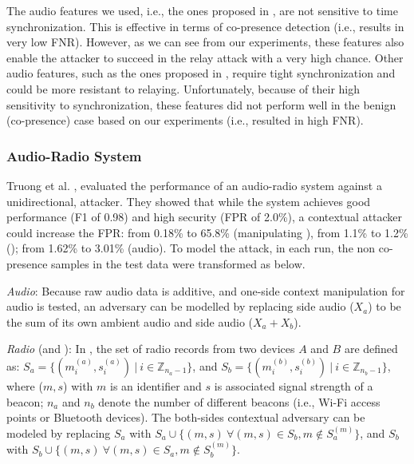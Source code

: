 The audio features we used, i.e., the ones proposed in
\cite{DBLP:conf/esorics/HaleviMSX12}, are not sensitive to time
synchronization. This is effective in terms of co-presence detection (i.e.,
results in very low FNR). However, as we can see from our experiments, these
features also enable the attacker to succeed in the relay attack with a very
high chance. Other audio features, such as the ones proposed in
\cite{schurmann2013audio}, require tight synchronization and could be more
resistant to relaying. Unfortunately, because of their high sensitivity to
synchronization, these features did not perform well in the benign
(co-presence) case based on our experiments (i.e., resulted in high FNR).










\subsubsection{Audio-Radio System}
Truong et al. \cite{TruongPerCom14}, evaluated the performance of an
audio-radio system against a unidirectional, \singlemodal attacker. They showed
that while the system achieves good performance (F1 of 0.98) and high security
(FPR of 2.0\%), a contextual attacker could increase the FPR: from 0.18\% to 65.8\%
(manipulating \wifi), from 1.1\% to 1.2\% (\bluetooth); from 1.62\% to 3.01\%
(audio). 
 To model the attack, in each run, the non
co-presence samples in the test data were transformed as below.






\noindent\textit{Audio}: Because raw audio data is additive, and one-side
context manipulation for audio is tested, an adversary can be modelled by
replacing \verifier side audio ($X_a$) to be the sum of its own ambient
audio and \prover side audio ($X_a + X_b$).
    
\noindent \textit{Radio} (\bluetooth and \wifi): In \cite{TruongPerCom14}, the
set of radio records from two devices $A$ and $B$ are defined as: $S_{a}
= \{(m^{(a)}_i,s^{(a)}_i)\ |\ i \in \mathbb{Z}_{n_a-1} \}$, and $S_{b}
= \{(m^{(b)}_i,s^{(b)}_i)\ |\ i \in \mathbb{Z}_{n_b-1} \}$, where ($m,s$) with
$m$ is an identifier and $s$ is associated signal strength of a beacon; $n_a$
and $n_b$ denote the number of different beacons (i.e., Wi-Fi access points or
Bluetooth devices). The both-sides contextual adversary can be modeled by
replacing $S_a$ with $S_a \cup \{(m, s) ~\forall (m, s) \in S_b, m \not \in
S^{(m)}_a\}$, and $S_b$ with $S_b \cup \{(m, s) ~\forall (m, s) \in S_a, m \not
\in S^{(m)}_b\}$.



